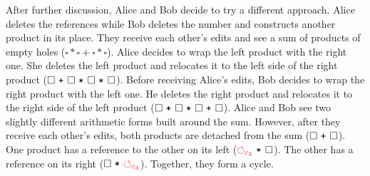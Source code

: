 \documentclass[nonacm, acmsmall, screen, review]{acmart}
\newcommand{\e}{\varepsilon}
\newcommand{\id}[1]{\textcolor{gray}{\ensuremath{#1}}}
\newcommand{\eid}[2]{{#2}^{\id{#1}}}
\newcommand{\hole}{\ensuremath{\square}} %
\newcommand{\ePlus}[3]{#2~\eid{#1}{\texttt{+}}~#3}
\newcommand{\eTimes}[3]{#2~\eid{#1}{\texttt{*}}~#3}
\newcommand{\cycleVertex}[1]{\textcolor{red}{\ensuremath{\circlearrowleft_{#1}}}}
\begin{document}
After further discussion, Alice and Bob decide to try a different approach.
Alice deletes the references while Bob deletes the number and constructs another product in its place.
They receive each other's edits and see a sum of products of empty holes ($\hole * \hole + \hole * \hole$).
Alice decides to wrap the left product with the right one.
She deletes the left product and relocates it to the left side of the right product ($\ePlus{}{\hole}{\eTimes{}{\eTimes{}{\hole}{\hole}}{\hole}}$).
Before receiving Alice's edits,
Bob decides to wrap the right product with the left one.
He deletes the right product and relocates it to the right side of the left product ($\ePlus{}{\eTimes{}{\hole}{\eTimes{}{\hole}{\hole}}}{\hole}$).
Alice and Bob see two slightly different arithmetic forms built around the sum.
However, after they receive each other's edits, both products are detached from the sum ($\ePlus{}{\hole}{\hole}$).
One product has a reference to the other on its left ($\eTimes{}{\cycleVertex{\e_2}}{\hole}$).
The other has a reference on its right ($\eTimes{}{\hole}{\cycleVertex{\e_3}}$).
Together, they form a cycle.








\end{document}
